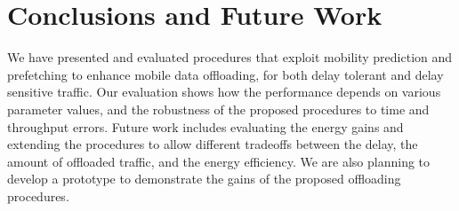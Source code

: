 \documentclass{sig-alternate}
\newcommand{\mynotex}[1]{}
\begin{document}
\section{Conclusions and Future Work}
\label{sec:conclusions}

We have presented and evaluated procedures that exploit mobility prediction and prefetching to enhance mobile data offloading, for both delay tolerant and delay sensitive traffic. Our evaluation shows how the performance depends on various parameter values, and the robustness of the proposed procedures to time and throughput errors.
Future work includes evaluating the  energy gains  and extending the procedures to allow different tradeoffs between the delay, the amount of offloaded traffic, and the energy efficiency. We are also planning to develop a  prototype to demonstrate the gains of the proposed offloading procedures.

\mynotex{
\begin{itemize}
\item evaluate energy gains
\item implement prototype, extending the OptiPath application. In a first phase this will involve only the procedure to exploit mobility prediction, since prefetching needs support (caching) at the WiFi hotspots.
\end{itemize}
}












{
 }
\end{document}
